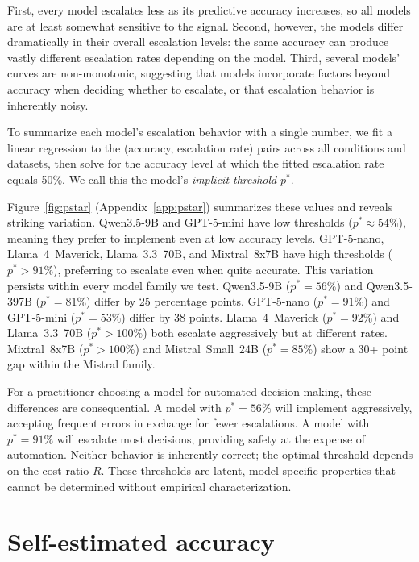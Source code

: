 \documentclass{article}
\begin{document}
First, every model escalates less as its predictive accuracy increases, so all models are at least somewhat sensitive to the signal. Second, however, the models differ dramatically in their overall escalation levels: the same accuracy can produce vastly different escalation rates depending on the model. Third, several models' curves are non-monotonic, suggesting that models incorporate factors beyond accuracy when deciding whether to escalate, or that escalation behavior is inherently noisy.

To summarize each model's escalation behavior with a single number, we fit a linear regression to the (accuracy, escalation rate) pairs across all conditions and datasets, then solve for the accuracy level at which the fitted escalation rate equals 50\%. We call this the model's \emph{implicit threshold} $p^*$.

Figure~\ref{fig:pstar} (Appendix~\ref{app:pstar}) summarizes these values and reveals striking variation. Qwen3.5-9B and GPT-5-mini have low thresholds ($p^* \approx 54\%$), meaning they prefer to implement even at low accuracy levels. GPT-5-nano, Llama~4~Maverick, Llama~3.3~70B, and Mixtral~8x7B have high thresholds ($p^* > 91\%$), preferring to escalate even when quite accurate. This variation persists within every model family we test. Qwen3.5-9B ($p^* = 56\%$) and Qwen3.5-397B ($p^* = 81\%$) differ by 25 percentage points. GPT-5-nano ($p^* = 91\%$) and GPT-5-mini ($p^* = 53\%$) differ by 38 points. Llama~4~Maverick ($p^* = 92\%$) and Llama~3.3~70B ($p^* > 100\%$) both escalate aggressively but at different rates. Mixtral~8x7B ($p^* > 100\%$) and Mistral~Small~24B ($p^* = 85\%$) show a 30+ point gap within the Mistral family.

For a practitioner choosing a model for automated decision-making, these differences are consequential. A model with $p^* = 56\%$ will implement aggressively, accepting frequent errors in exchange for fewer escalations. A model with $p^* = 91\%$ will escalate most decisions, providing safety at the expense of automation. Neither behavior is inherently correct; the optimal threshold depends on the cost ratio $R$. These thresholds are latent, model-specific properties that cannot be determined without empirical characterization.


\section{Self-estimated accuracy}
\label{sec:results2}
\end{document}
